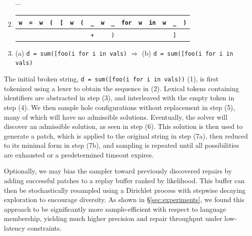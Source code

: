 \documentclass[sigplan,review,anonymous,acmsmall]{acmart}\settopmatter{printfolios=false,printccs=false,printacmref=false}
\begin{document}
\begin{enumerate}
\begin{tabular}{|||c|||c|||c|||c|||c|||c|||c|||c|||c|||c|||c|||c|||c|||c|||c|||}
  \end{tabular}\\$\cdots$
  \item \begin{tabular}{|||c|||c|||c|||c|||c|||c|||c||c|c|||c|||c|||c|||c|||c|||c|||c|||}
          \hline
          \texttt{w} & \texttt{=} & \texttt{w} & \texttt{(} & \texttt{[} & \texttt{w} & \texttt{(} & \cellcolor{black!15}\texttt{\_} &  \texttt{w} & \cellcolor{black!15}\texttt{\_} & \texttt{for} & \texttt{w} & \texttt{in} & \texttt{w} & \cellcolor{black!15}\texttt{\_} & \texttt{)} \\\hline
          & & & & & & & \cellcolor{green!25}\texttt{+} & & \cellcolor{orange!25}\texttt{)} & & & & & \cellcolor{orange!25}\texttt{]} & \\\hline
  \end{tabular}
  \item (a) \texttt{d = sum([foo(\hlgreen{+}i\hlorange{)} for i in vals\hlorange{]})} $\Longrightarrow$ (b) \texttt{d = sum([foo(i\hlorange{)} for i in vals\hlorange{]})}
\end{enumerate}

The initial broken string, \texttt{d = sum([foo(i\err{]} for i in vals))} (1), is first tokenized using a lexer to obtain the sequence in (2). Lexical tokens containing identifiers are abstracted in step (3), and interleaved with the empty token in step (4). We then sample hole configurations without replacement in step (5), many of which will have no admissible solutions. Eventually, the solver will discover an admissible solution, as seen in step (6). This solution is then used to generate a patch, which is applied to the original string in step (7a), then reduced to its minimal form in step (7b), and sampling is repeated until all possibilities are exhausted or a predetermined timeout expires.

Optionally, we may bias the sampler toward previously discovered repairs by adding successful patches to a replay buffer ranked by likelihood. This buffer can then be stochastically resampled using a Dirichlet process with stepwise decaying exploration to encourage diversity. As shown in \S\ref{sec:experiments}, we found this approach to be significantly more sample-efficient with respect to language membership, yielding much higher precision and repair throughput under low-latency constraints.
\end{document}
